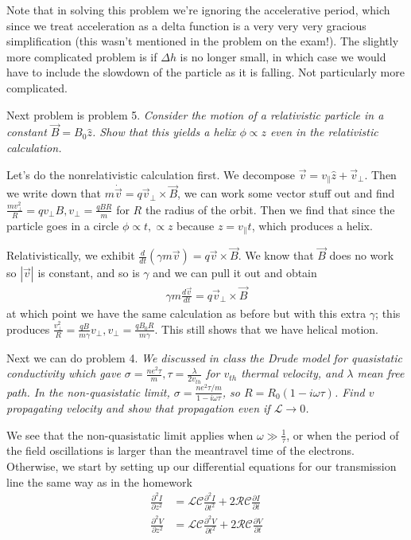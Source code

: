 \documentclass[10pt]{report}
\newcommand{\rd}[2]{\frac{d#1}{d#2}}
\newcommand{\pd}[2]{\frac{\partial #1}{\partial#2}}
\newcommand{\ptd}[2]{\frac{\partial^2 #1}{\partial#2^2}}
\newcommand{\abs}[1]{\left|#1\right|}
\begin{document}
Note that in solving this problem we're ignoring the accelerative period, which since we treat acceleration as a delta function is a very very very gracious simplification (this wasn't mentioned in the problem on the exam!). The slightly more complicated problem is if $\Delta h$ is no longer small, in which case we would have to include the slowdown of the particle as it is falling. Not particularly more complicated.

Next problem is problem 5. \emph{Consider the motion of a relativistic particle in a constant $\vec{B} = B_0\hat{z}$. Show that this yields a helix $\phi \propto z$ even in the relativistic calculation.}

Let's do the nonrelativistic calculation first. We decompose $\vec{v} = v_{\parallel}\hat{z} + \vec{v}_{\perp}$. Then we write down that $m\dot{\vec{v}} = q\vec{v}_{\perp} \times \vec{B}$, we can work some vector stuff out and find $\frac{mv_{\perp}^2}{R} = qv_{\perp}B, v_{\perp} = \frac{qBR}{m}$ for $R$ the radius of the orbit. Then we find that since the particle goes in a circle $\phi \propto t, \propto z$ because $z = v_{\parallel}t$, which produces a helix.

Relativistically, we exhibit $\rd{}{t}(\gamma m\vec{v}) = q\vec{v} \times \vec{B}$. We know that $\vec{B}$ does no work so $\abs{\vec{v}}$ is constant, and so is $\gamma$ and we can pull it out and obtain
\begin{align}
    \gamma m\rd{\vec{v}}{t} = q\vec{v}_{\perp}\times \vec{B}
\end{align}
at which point we have the same calculation as before but with this extra $\gamma$; this produces $\frac{v_{\perp}^2}{R} = \frac{qB}{m\gamma}v_{\perp}, v_{\perp} = \frac{qB_0R}{m\gamma}$. This still shows that we have helical motion.

Next we can do problem 4. \emph{We discussed in class the Drude model for quasistatic conductivity which gave $\sigma = \frac{ne^2\tau}{m}, \tau = \frac{\lambda}{2v_{th}}$ for $v_{th}$ thermal velocity, and $\lambda$ mean free path. In the non-quasistatic limit, $\sigma = \frac{ne^2\tau/m}{1 - i\omega \tau}$, so $R = R_0(1 - i\omega \tau)$. Find $v$ propagating velocity and show that propagation even if $\mathcal{L} \to 0$.}

We see that the non-quasistatic limit applies when $\omega \gg \frac{1}{\tau}$, or when the period of the field oscillations is larger than the meantravel time of the electrons. Otherwise, we start by setting up our differential equations for our transmission line the same way as in the homework
\begin{align}
    \ptd{I}{z} &= \mathcal{LC}\ptd{I}{t} + 2\mathcal{RC}\pd{I}{t}\\
    \ptd{V}{z} &= \mathcal{LC}\ptd{V}{t} + 2\mathcal{RC}\pd{V}{t}
\end{align}
\end{document}
